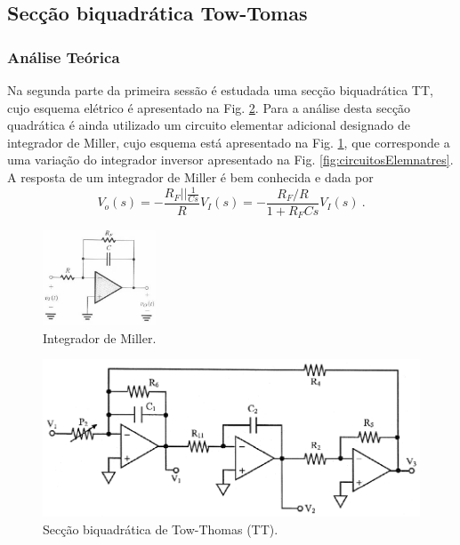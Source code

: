 \subsection{Secção biquadrática Tow-Tomas}
\subsubsection{Análise Teórica}

Na segunda parte da primeira sessão é estudada uma secção biquadrática TT, cujo esquema elétrico é apresentado na Fig. \ref{fig:tow_thomas_montagem}. Para a análise desta secção quadrática é ainda utilizado um circuito elementar adicional designado de integrador de Miller, cujo esquema está apresentado na Fig. \ref{fig:miller}, que corresponde a uma variação do integrador inversor apresentado na Fig. \ref{fig:circuitosElemnatres}. A resposta de um integrador de Miller é bem conhecida e dada por 
\begin{equation}\label{eq:miller}
    V_o(s)=-\frac{R_F||\frac{1}{Cs}}{R}V_I(s) = -\frac{R_F/R}{1+R_FCs}V_I(s)\:.
\end{equation}
\begin{figure}[h!]
    \centering
    \includegraphics[width = 0.3\textwidth]{Imagens/miller.jpg}
    \caption{Integrador de Miller.}
    \label{fig:miller}
\end{figure}

\begin{figure}[h!]
    \centering
    \includegraphics{Imagens/tow_thomas_montagem.pdf}
    \caption{Secção biquadrática de Tow-Thomas (TT).}
    \label{fig:tow_thomas_montagem}
\end{figure}

